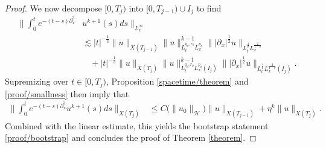 \documentclass[10pt, reqno]{amsart}
\numberwithin{equation}{section}
\theoremstyle{definition}
\theoremstyle{remark}
\begin{document}
\begin{proof}
    We now decompose $[0,T_j)$ into $[0,T_{j-1}) \cup I_j$ to find
    \begin{equation}\begin{split}\label{proof/2}
        \bigg\|\int_0^t e^{-(t-s)\partial^3_x}& u^{k+1}(s)ds \bigg\|_{L_x^\infty} \\
         & \lesssim |t|^{-\frac{1}{3}}\|u\|_{X(T_{j-1})}\|u\|^{k-1}_{L_t^{q_\theta,r_\theta}L_x^{p_\theta}}\big\||\partial_x|^{\frac{1}{2}}u\big\|_{L_t^\frac{4}{\theta} L_x^\frac{2}{1-\theta}} \\
         & \hspace{11pt} + |t|^{-\frac{1}{3}}\|u\|_{X(T_{j})}\|u\|^{k-1}_{L_t^{q_\theta,r_\theta}L_x^{p_\theta}(I_j)}\big\||\partial_x|^{\frac{1}{2}}u\big\|_{L_t^\frac{4}{\theta} L_x^\frac{2}{1-\theta}(I_j)}.
    \end{split}\end{equation}
    Supremizing over $t \in [0,T_j)$, Proposition \ref{spacetime/theorem} and \eqref{proof/smallness} then imply that
    \begin{align*}
        \bigg\|\int_0^t e^{-(t-s)\partial^3_x}u^{k+1}(s)ds\bigg\|_{X(T_j)}
         & \leq C\big(\|u_0\|_{\mathcal{H}}\big)\|u\|_{X(T_{j-1})} + \eta^k\|u\|_{X(T_{j})}.
    \end{align*}
    Combined with the linear estimate, this yields the bootstrap statement \eqref{proof/bootstrap} and concludes the proof of Theorem \ref{theorem}.
\end{proof}



\end{document}
